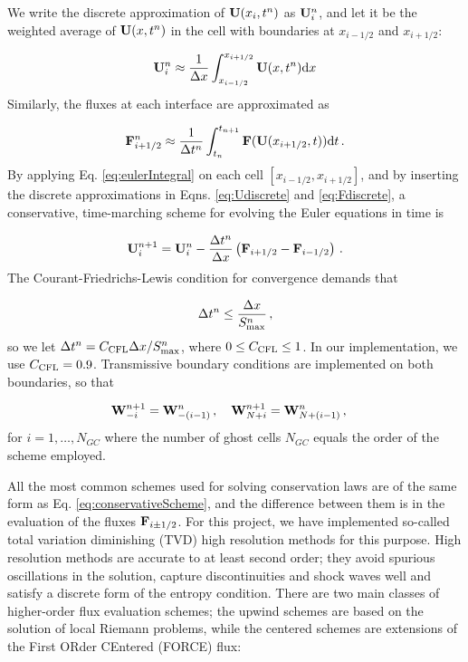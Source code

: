 \documentclass[final,3p,twocolumn]{elsarticle}
\begin{document}
We write the discrete
approximation of ${\bf U}(x_i, t^n)$ as ${\bf U}_i^n$, and let it be the
weighted average of ${\bf U}(x,t^n)$ in the cell with boundaries at
$x_{i-1/2}$ and $x_{i+1/2}$: 

\begin{equation}
    {\bf U}_i^n \approx \frac{1}{\Delta x} \int_{x_{i-1/2}}^{x_{i+1/2}} {\bf
    U}(x,t^n) {\rm d}x 
    \label{eq:Udiscrete}
\end{equation}
%
Similarly, the fluxes at each interface are approximated as 

\begin{equation}
    {\bf F}_{i+1/2}^n \approx \frac{1}{\Delta t^n} 
    \int_{t_{n}}^{t_{n+1}} {\bf F}({\bf U}(x_{i+1/2},t)) {\rm d}t \,. 
    \label{eq:Fdiscrete}
\end{equation}
%
By applying Eq. \eqref{eq:eulerIntegral} on each cell $[x_{i-1/2},x_{i+1/2}]$,
and by inserting the discrete approximations in Eqns. \eqref{eq:Udiscrete} and
\eqref{eq:Fdiscrete}, a conservative, time-marching scheme for evolving the
Euler equations in time is 

\begin{equation}
    {\bf U}_i^{n+1} = {\bf U}_i^n - \frac{\Delta t^n}{\Delta x} \left(
    {\bf F}_{i+1/2} - {\bf F}_{i-1/2} \right) \,. 
    \label{eq:conservativeScheme}
\end{equation}
%
The Courant-Friedrichs-Lewis condition for convergence demands that 

\begin{equation}
    \label{eq:timeStep}
    \Delta t^n \leq \frac{\Delta x}{S_{\rm max}^n} \,,
\end{equation}
%
so we let $\Delta t^n = C_{\rm CFL} \Delta x / S_{\rm max}^n$, where $0 \leq
C_{\rm CFL} \leq 1$. In our implementation, we use $C_{\rm CFL}=0.9$.
Transmissive boundary conditions are implemented on both boundaries, so that

\begin{equation}
    \label{eq:BCs} 
    {\bf W}_{-i}^{n+1} = {\bf W}_{-(i-1)}^{n} \,, \quad
    {\bf W}_{N+i}^{n+1} = {\bf W}_{N+(i-1)}^{n} \,, \quad 
\end{equation}
%
for $i=1, \dots, N_{GC}$ where the number of ghost cells $N_{GC}$ equals the
order of the scheme employed. 

All the most common schemes used for solving conservation laws are of the same
form as Eq. \eqref{eq:conservativeScheme}, and the difference between them is
in the evaluation of the fluxes ${\bf F}_{i\pm 1/2}$. For this project, we have
implemented so-called total variation diminishing (TVD) high resolution methods
for this purpose. High resolution methods are accurate to at least second
order; they avoid spurious oscillations in the solution, capture
discontinuities and shock waves well and satisfy a discrete form of the entropy
condition. There are two main classes of higher-order flux evaluation schemes;
the upwind schemes are based on the solution of local Riemann problems, while
the centered schemes are extensions of the First ORder CEntered (FORCE) flux: 
\end{document}
